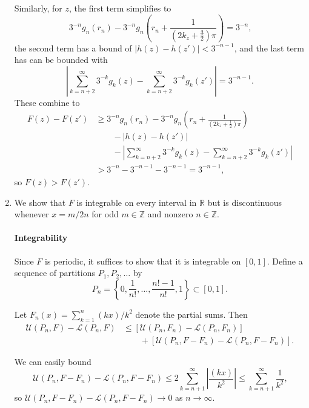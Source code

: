 \documentclass[oneside]{article}
\newcommand\abs[1]{\left|#1\right|}
\newcommand\bbR{\mathbb{R}}
\newcommand\bbZ{\mathbb{Z}}
\newcommand\calL{\mathcal{L}}
\newcommand\calU{\mathcal{U}}
\begin{document}
\begin{enumerate}[label=(\alph*)]
      Similarly, for $z$, the first term simplifies to\[
        3^{-n}g_n(r_n) - 3^{-n}g_n\left(r_n + \frac1{\left(2k_z + \frac32\right)\pi}\right)
        = 3^{-n} \text{,}
      \] the second term has a bound of $\abs{h(z) - h(z')} < 3^{-n-1}$, and the last term has can be bounded with \[
        \abs{\sum_{k=n+2}^\infty 3^{-k} g_k(z) - \sum_{k=n+2}^\infty 3^{-k} g_k(z')} = 3^{-n-1} \text{.}
      \] These combine to\begin{align*}
        F(z) - F(z')
        &\geq 3^{-n}g_n(r_n) - 3^{-n}g_n\left(r_n + \frac1{\left(2k_z + \frac12\right)\pi}\right) \\
        &\qquad - \abs{h(z) - h(z')} \\
        &\qquad - \abs{\sum_{k=n+2}^\infty 3^{-k} g_k(z) - \sum_{k=n+2}^\infty 3^{-k} g_k(z')} \\
        &> 3^{-n} - 3^{-n-1} - 3^{-n-1} = 3^{-n-1} \text{,}
      \end{align*} so $F(z) > F(z')$.

    \item We show that $F$ is integrable on every interval in $\bbR$ but is discontinuous whenever $x = m/2n$ for odd $m \in \bbZ$ and nonzero $n \in \bbZ$.

    \paragraph{Integrability} Since $F$ is periodic, it suffices to show that it is integrable on $[0, 1]$. Define a sequence of partitions $P_1, P_2, \dots$ by \[
      P_n = \left\{0, \frac{1}{n!}, \dots, \frac{n! - 1}{n!}, 1\right\} \subset [0, 1] \text{.}
    \]

    Let $F_n(x) = \sum_{k=1}^n (kx)/k^2$ denote the partial sums. Then \begin{align*}
      \calU(P_n, F) - \calL(P_n, F)
      &\leq \left[\calU(P_n, F_n) - \calL(P_n, F_n)\right] \\
      &\qquad+ \left[\calU(P_n, F - F_n) - \calL(P_n, F - F_n)\right] \text{.}
    \end{align*}

    We can easily bound \[
      \calU(P_n, F - F_n) - \calL(P_n, F - F_n)
      \leq 2\sum_{k=n+1}^\infty \abs{\frac{(kx)}{k^2}}
      \leq \sum_{k=n+1}^\infty \frac{1}{k^2}
      \text{,}
    \] so $\calU(P_n, F - F_n) - \calL(P_n, F - F_n) \to 0$ as $n \to \infty$.


\end{enumerate}
\end{document}
